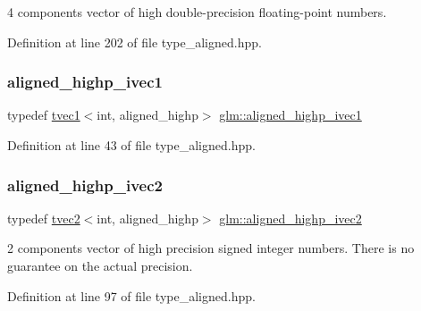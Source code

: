 4 components vector of high double-\/precision floating-\/point numbers. 



Definition at line 202 of file type\+\_\+aligned.\+hpp.

\mbox{\label{group__gtc__type__aligned_gaebfad60737b3a3ec596dc0341ed538c3}} 
\subsubsection{\texorpdfstring{aligned\_highp\_ivec1}{aligned\_highp\_ivec1}}
{\footnotesize\ttfamily typedef \mbox{\hyperlink{structglm_1_1tvec1}{tvec1}}$<$int, aligned\+\_\+highp$>$ \mbox{\hyperlink{group__gtc__type__aligned_gaebfad60737b3a3ec596dc0341ed538c3}{glm\+::aligned\+\_\+highp\+\_\+ivec1}}}



Definition at line 43 of file type\+\_\+aligned.\+hpp.

\mbox{\label{group__gtc__type__aligned_ga9fe485a34b77916c1817ab4ba2ad3b20}} 
\subsubsection{\texorpdfstring{aligned\_highp\_ivec2}{aligned\_highp\_ivec2}}
{\footnotesize\ttfamily typedef \mbox{\hyperlink{structglm_1_1tvec2}{tvec2}}$<$int, aligned\+\_\+highp$>$ \mbox{\hyperlink{group__gtc__type__aligned_ga9fe485a34b77916c1817ab4ba2ad3b20}{glm\+::aligned\+\_\+highp\+\_\+ivec2}}}

2 components vector of high precision signed integer numbers. There is no guarantee on the actual precision. 

Definition at line 97 of file type\+\_\+aligned.\+hpp.

\mbox{\label{group__gtc__type__aligned_gac7f1892e381baa066488c0b6d1bf16ad}} 
